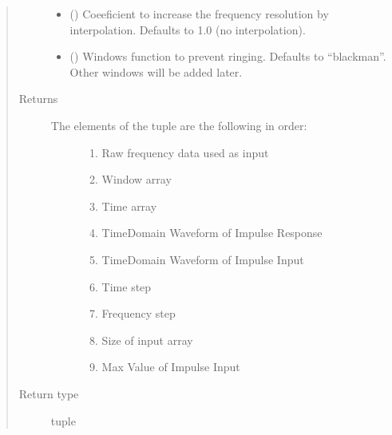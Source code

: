 \documentclass[letterpaper,10pt,english]{sphinxmanual}
\begin{document}
\begin{fulllineitems}
\begin{fulllineitems}
\begin{quote}
\begin{description}
\begin{itemize}
\item {} 
 (\sphinxstyleliteralemphasis{\sphinxupquote{, }}) \textendash{} Coeeficient to increase the frequency resolution by interpolation. Defaults to 1.0 (no interpolation).

\item {} 
 (\sphinxstyleliteralemphasis{\sphinxupquote{, }}) \textendash{} Windows function to prevent ringing. Defaults to “blackman”. Other windows will be added later.

\end{itemize}

\item[{Returns}] \leavevmode
\begin{description}
\item[{The elements of the tuple are the following in order:}] \leavevmode\begin{enumerate}
%
\item {} 
Raw frequency data used as input

\item {} 
Window array

\item {} 
Time array

\item {} 
Time\sphinxhyphen{}Domain Waveform of Impulse Response

\item {} 
Time\sphinxhyphen{}Domain Waveform of Impulse Input

\item {} 
Time step

\item {} 
Frequency step

\item {} 
Size of input array

\item {} 
Max Value of Impulse Input

\end{enumerate}

\end{description}


\item[{Return type}] \sphinxhyphen{}tuple


\end{description}
\end{quote}
\end{fulllineitems}
\end{fulllineitems}
\end{document}

